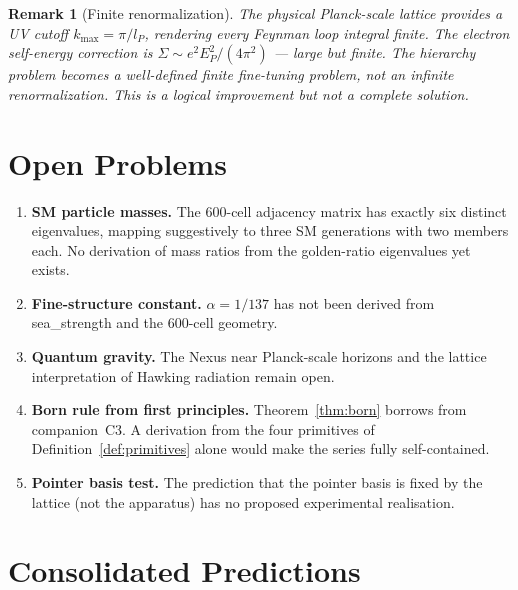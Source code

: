 \documentclass[11pt,a4paper]{article}
\newtheorem{remark}[theorem]{Remark}
\newcommand{\lP}{l_P}
\newcommand{\EP}{E_P}
\begin{document}
\begin{remark}[Finite renormalization]
The physical Planck-scale lattice provides a UV cutoff
$k_{\max} = \pi/\lP$, rendering every Feynman loop integral finite.
The electron self-energy correction is $\Sigma \sim e^2\EP^2/(4\pi^2)$
— large but finite. The hierarchy problem becomes a well-defined
finite fine-tuning problem, not an infinite renormalization.
This is a logical improvement but not a complete solution.
\end{remark}

\section{Open Problems}

\begin{enumerate}
\item \textbf{SM particle masses.} The 600-cell adjacency matrix has
  exactly six distinct eigenvalues, mapping suggestively to three SM
  generations with two members each. No derivation of mass ratios from
  the golden-ratio eigenvalues yet exists.

\item \textbf{Fine-structure constant.} $\alpha = 1/137$ has not been
  derived from sea\_strength and the 600-cell geometry.

\item \textbf{Quantum gravity.} The Nexus near Planck-scale horizons
  and the lattice interpretation of Hawking radiation remain open.

\item \textbf{Born rule from first principles.} Theorem~\ref{thm:born}
  borrows from companion~C3. A derivation from the four primitives
  of Definition~\ref{def:primitives} alone would make the series
  fully self-contained.

\item \textbf{Pointer basis test.} The prediction that the pointer basis
  is fixed by the lattice (not the apparatus) has no proposed
  experimental realisation.
\end{enumerate}

\section{Consolidated Predictions}
\end{document}
